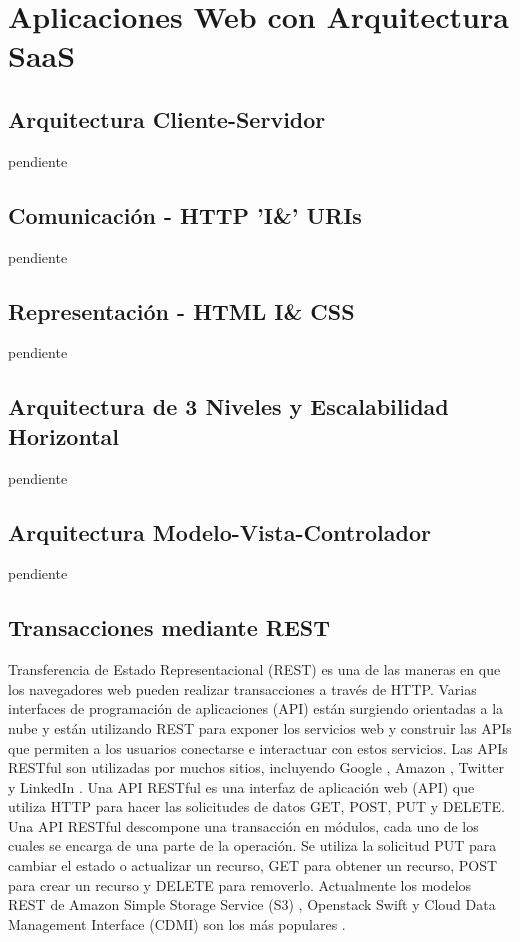 \chapter{Aplicaciones Web con Arquitectura SaaS}

\section{Arquitectura Cliente-Servidor}
pendiente
\section{Comunicación - HTTP 'I\&' URIs}
pendiente
\section{Representación -  HTML I\& CSS}
pendiente
\section{Arquitectura de 3 Niveles y Escalabilidad Horizontal}
pendiente
\section{Arquitectura Modelo-Vista-Controlador}
pendiente
\section{Transacciones mediante REST}
Transferencia de Estado Representacional (REST) es una de las maneras en que los navegadores web pueden realizar transacciones a través de HTTP. Varias interfaces de programación de aplicaciones (API) están surgiendo orientadas a la nube y están utilizando REST para exponer los servicios web y construir las APIs que permiten a los usuarios conectarse e interactuar con estos servicios.
Las APIs RESTful son utilizadas por muchos sitios, incluyendo Google \parencite{Google-Inc2016-lm}, Amazon \parencite{Aws2016-iu}, Twitter \parencite{Twitter2016-df} y LinkedIn \parencite{LinkedIn2016-am}.
Una API RESTful es una interfaz de aplicación web (API) que utiliza HTTP para hacer las solicitudes de datos GET, POST, PUT y DELETE.
Una API RESTful descompone una transacción en módulos, cada uno de los cuales se encarga de una parte de la operación. Se utiliza la solicitud PUT para cambiar el estado o actualizar un recurso, GET para obtener un recurso, POST para crear un recurso y DELETE para removerlo. Actualmente los modelos REST de Amazon Simple Storage Service (S3) \parencite{Aws2016-tc}, Openstack Swift \parencite{OpenStack2016-ht} y Cloud Data Management Interface (CDMI) \parencite{Snia2016-vq} son los más populares \parencite{Richardson2008-ng}.

